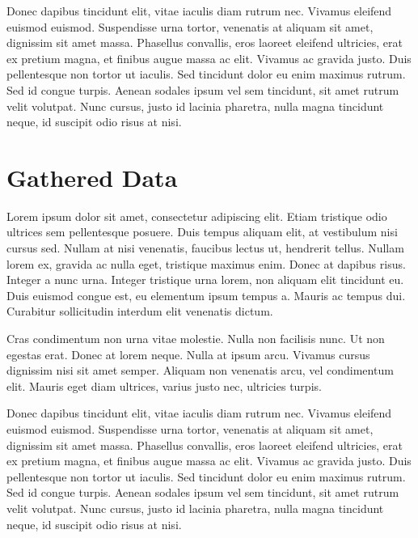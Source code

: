 \documentclass[11pt, a4paper]{JTH}
\begin{document}
Donec dapibus tincidunt elit, vitae iaculis diam rutrum nec. Vivamus eleifend euismod euismod. Suspendisse urna tortor, venenatis at aliquam sit amet, dignissim sit amet massa. Phasellus convallis, eros laoreet eleifend ultricies, erat ex pretium magna, et finibus augue massa ac elit. Vivamus ac gravida justo. Duis pellentesque non tortor ut iaculis. Sed tincidunt dolor eu enim maximus rutrum. Sed id congue turpis. Aenean sodales ipsum vel sem tincidunt, sit amet rutrum velit volutpat. Nunc cursus, justo id lacinia pharetra, nulla magna tincidunt neque, id suscipit odio risus at nisi.




\appendix

\chapter{Gathered Data}
\label{chap:data}

Lorem ipsum dolor sit amet, consectetur adipiscing elit. Etiam tristique odio ultrices sem pellentesque posuere. Duis tempus aliquam elit, at vestibulum nisi cursus sed. Nullam at nisi venenatis, faucibus lectus ut, hendrerit tellus. Nullam lorem ex, gravida ac nulla eget, tristique maximus enim. Donec at dapibus risus. Integer a nunc urna. Integer tristique urna lorem, non aliquam elit tincidunt eu. Duis euismod congue est, eu elementum ipsum tempus a. Mauris ac tempus dui. Curabitur sollicitudin interdum elit venenatis dictum.

Cras condimentum non urna vitae molestie. Nulla non facilisis nunc. Ut non egestas erat. Donec at lorem neque. Nulla at ipsum arcu. Vivamus cursus dignissim nisi sit amet semper. Aliquam non venenatis arcu, vel condimentum elit. Mauris eget diam ultrices, varius justo nec, ultricies turpis.

Donec dapibus tincidunt elit, vitae iaculis diam rutrum nec. Vivamus eleifend euismod euismod. Suspendisse urna tortor, venenatis at aliquam sit amet, dignissim sit amet massa. Phasellus convallis, eros laoreet eleifend ultricies, erat ex pretium magna, et finibus augue massa ac elit. Vivamus ac gravida justo. Duis pellentesque non tortor ut iaculis. Sed tincidunt dolor eu enim maximus rutrum. Sed id congue turpis. Aenean sodales ipsum vel sem tincidunt, sit amet rutrum velit volutpat. Nunc cursus, justo id lacinia pharetra, nulla magna tincidunt neque, id suscipit odio risus at nisi.
\end{document}

